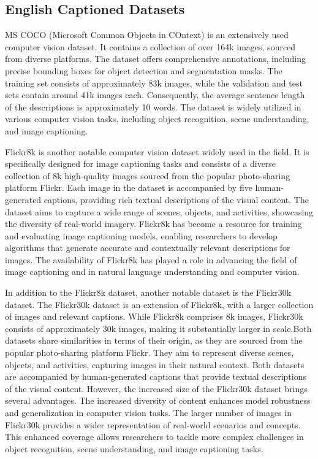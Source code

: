 \documentclass[runningheads]{llncs}
\begin{document}
\subsection{English Captioned Datasets}
MS COCO (Microsoft Common Objects in COntext) \cite{MSCOCO} is an extensively used computer vision dataset. It contains a collection of over 164k images, sourced from diverse platforms. The dataset offers comprehensive annotations, including precise bounding boxes for object detection and segmentation masks. The training set consists of approximately 83k images, while the validation and test sets contain around 41k images each. Consequently, the average sentence length of the descriptions is approximately 10 words. The dataset is widely utilized in various computer vision tasks, including object recognition, scene understanding, and image captioning.

Flickr8k \cite{Flickr8k} is another notable computer vision dataset widely used in the field. It is specifically designed for image captioning tasks and consists of a diverse collection of 8k high-quality images sourced from the popular photo-sharing platform Flickr. Each image in the dataset is accompanied by five human-generated captions, providing rich textual descriptions of the visual content. The dataset aims to capture a wide range of scenes, objects, and activities, showcasing the diversity of real-world imagery. Flickr8k has become a resource for training and evaluating image captioning models, enabling researchers to develop algorithms that generate accurate and contextually relevant descriptions for images. The availability of Flickr8k has played a role in advancing the field of image captioning and in natural language understanding and computer vision.

In addition to the Flickr8k dataset, another notable dataset is the Flickr30k dataset. The Flickr30k \cite{Flickr30k} dataset is an extension of Flickr8k, with a larger collection of images and relevant captions. While Flickr8k comprises 8k images, Flickr30k consists of approximately 30k images, making it substantially larger in scale.Both datasets share similarities in terms of their origin, as they are sourced from the popular photo-sharing platform Flickr. They aim to represent diverse scenes, objects, and activities, capturing images in their natural context. Both datasets are accompanied by human-generated captions that provide textual descriptions of the visual content. However, the increased size of the Flickr30k dataset brings several advantages. The increased diversity of content enhances model robustness and generalization in computer vision tasks. The larger number of images in Flickr30k provides a wider representation of real-world scenarios and concepts. This enhanced coverage allows researchers to tackle more complex challenges in object recognition, scene understanding, and image captioning tasks. 
\end{document}
